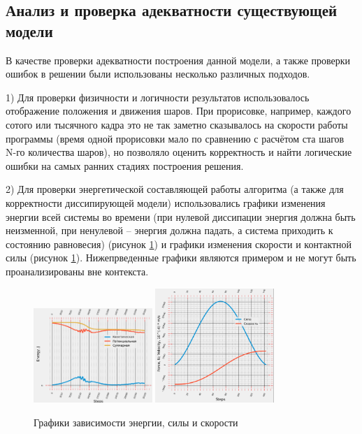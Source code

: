 \documentclass[a4paper]{article}
\begin{document}
\subsection{Анализ и проверка адекватности существующей модели}

В качестве проверки адекватности построения данной модели, а также проверки ошибок в решении были использованы несколько различных подходов.

1) Для проверки физичности и логичности результатов использовалось отображение положения и движения шаров.
При прорисовке, например, каждого сотого или тысячного кадра это не так заметно сказывалось на скорости работы программы (время одной прорисовки мало по сравнению с расчётом ста шагов N-го количества шаров), но позволяло оценить корректность и найти логические ошибки на самых ранних стадиях построения решения.

2) Для проверки энергетической составляющей работы алгоритма (а также для корректности диссипирующей модели) использовались графики изменения энергии всей системы во времени (при нулевой диссипации энергия должна быть неизменной, при ненулевой -- энергия должна падать, а система приходить к состоянию равновесия) (рисунок \ref{pic:graphs}) и графики изменения скорости и контактной силы (рисунок \ref{pic:graphs}). Нижепрведенные графики являются примером и не могут быть проанализированы вне контекста.


\begin{figure}[h!]
	\centering
	\includegraphics[width=0.4\textwidth]{graph1} 
	\includegraphics[width=0.4\textwidth]{graph2}
	\caption{Графики зависимости энергии, силы и скорости}
	\label{pic:graphs}
\end{figure} 
\end{document}
